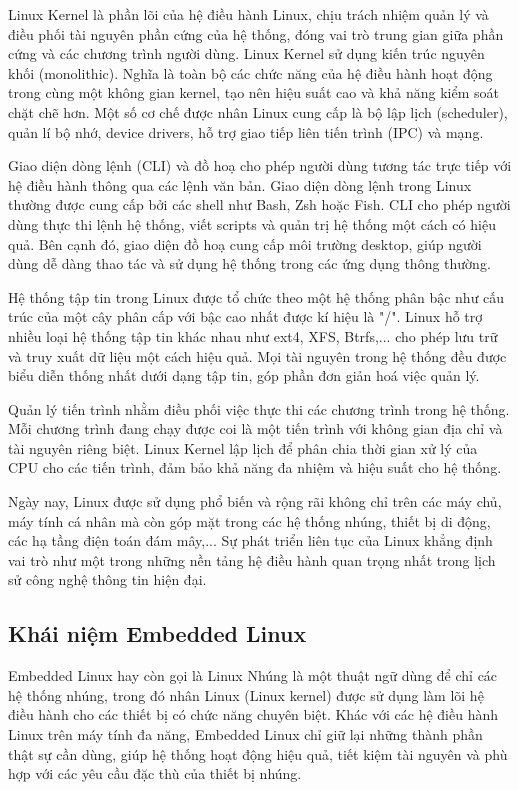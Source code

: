 Linux Kernel là phần lõi của hệ điều hành Linux, chịu trách nhiệm quản lý và điều phối tài nguyên phần cứng của hệ thống, đóng vai trò trung gian giữa phần cứng và các chương trình người dùng. Linux Kernel sử dụng kiến trúc nguyên khối (monolithic). Nghĩa là toàn bộ các chức năng của hệ điều hành hoạt động trong cùng một không gian kernel, tạo nên hiệu suất cao và khả năng kiểm soát chặt chẽ hơn. Một số cơ chế được nhân Linux cung cấp là bộ lập lịch (scheduler), quản lí bộ nhớ, device drivers, hỗ trợ giao tiếp liên tiến trình (IPC) và mạng.


Giao diện dòng lệnh (CLI) và đồ hoạ cho phép người dùng tương tác trực tiếp với hệ điều hành thông qua các lệnh văn bản. Giao diện dòng lệnh trong Linux thường được cung cấp bởi các shell như Bash, Zsh hoặc Fish. CLI cho phép người dùng thực thi lệnh hệ thống, viết scripts và quản trị hệ thống một cách có hiệu quả. Bên cạnh đó, giao diện đồ hoạ cung cấp môi trường desktop, giúp người dùng dễ dàng thao tác và sử dụng hệ thống trong các ứng dụng thông thường.


Hệ thống tập tin trong Linux được tổ chức theo một hệ thống phân bậc như cấu trúc của một cây phân cấp với bậc cao nhất được kí hiệu là "/". Linux hỗ trợ nhiều loại hệ thống tập tin khác nhau như ext4, XFS, Btrfs,... cho phép lưu trữ và truy xuất dữ liệu một cách hiệu quả. Mọi tài nguyên trong hệ thống đều được biểu diễn thống nhất dưới dạng tập tin, góp phần đơn giản hoá việc quản lý.


Quản lý tiến trình nhằm điều phối việc thực thi các chương trình trong hệ thống. Mỗi chương trình đang chạy được coi là một tiến trình với không gian địa chỉ và tài nguyên riêng biệt. Linux Kernel lập lịch để phân chia thời gian xử lý của CPU cho các tiến trình, đảm bảo khả năng đa nhiệm và hiệu suất cho hệ thống.


Ngày nay, Linux được sử dụng phổ biến và rộng rãi không chỉ trên các máy chủ, máy tính cá nhân mà còn góp mặt trong các hệ thống nhúng, thiết bị di động, các hạ tầng điện toán đám mây,... Sự phát triển liên tục của Linux khẳng định vai trò như một trong những nền tảng hệ điều hành quan trọng nhất trong lịch sử công nghệ thông tin hiện đại.




\subsection{Khái niệm Embedded Linux}
Embedded Linux hay còn gọi là Linux Nhúng là một thuật ngữ dùng để chỉ các hệ thống nhúng, trong đó nhân Linux (Linux kernel) được sử dụng làm lõi hệ điều hành cho các thiết bị có chức năng chuyên biệt. Khác với các hệ điều hành Linux trên máy tính đa năng, Embedded Linux chỉ giữ lại những thành phần thật sự cần dùng, giúp hệ thống hoạt động hiệu quả, tiết kiệm tài nguyên và phù hợp với các yêu cầu đặc thù của thiết bị nhúng.


